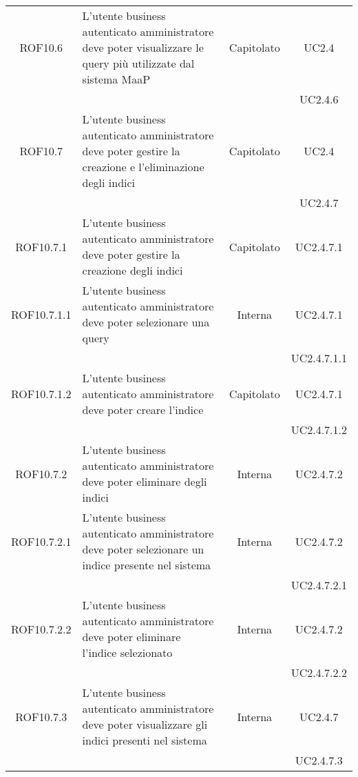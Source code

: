 \begin{longtable}{|c|p{6cm}|c|c|}
\midrule
ROF10.6
& L'utente business autenticato amministratore deve poter visualizzare le query più utilizzate dal sistema MaaP
& Capitolato
& UC2.4\\
& & & UC2.4.6
\\

\midrule
ROF10.7
& L'utente business autenticato amministratore deve poter gestire la creazione e l'eliminazione degli indici
& Capitolato
& UC2.4\\
& & & UC2.4.7
\\

\midrule
ROF10.7.1
& L'utente business autenticato amministratore deve poter gestire la creazione degli indici
& Capitolato
& UC2.4.7.1\\

\midrule
ROF10.7.1.1
& L'utente business autenticato amministratore deve poter selezionare una query
& Interna
& UC2.4.7.1\\
& & & UC2.4.7.1.1
\\

\midrule
ROF10.7.1.2
& L'utente business autenticato amministratore deve poter creare l'indice
& Capitolato
& UC2.4.7.1\\
& & & UC2.4.7.1.2
\\


\midrule
ROF10.7.2
& L'utente business autenticato amministratore deve poter eliminare degli indici
& Interna
& UC2.4.7.2\\

\midrule
ROF10.7.2.1
& L'utente business autenticato amministratore deve poter selezionare un indice presente nel sistema
& Interna
& UC2.4.7.2\\
& & & UC2.4.7.2.1
\\

\midrule
ROF10.7.2.2
& L'utente business autenticato amministratore deve poter eliminare l'indice selezionato
& Interna
& UC2.4.7.2\\
& & & UC2.4.7.2.2
\\

\midrule
ROF10.7.3
& L'utente business autenticato amministratore deve poter visualizzare gli indici presenti nel sistema
& Interna
& UC2.4.7\\
& & & UC2.4.7.3
\\


\end{longtable}

\newpage
